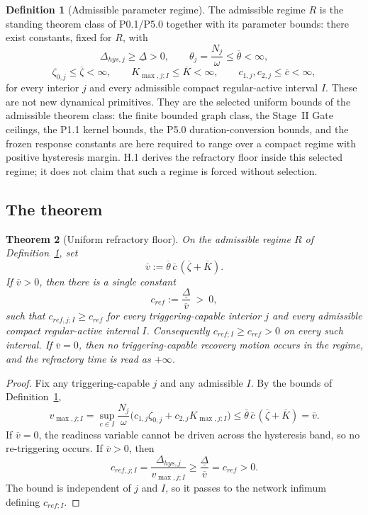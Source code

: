 \documentclass[11pt,a4paper]{article}
\newcommand{\cint}{\ensuremath{\mathfrak c}}
\def\mathfrak#1{#1}%
\def\mathrm#1{#1}%
\theoremstyle{definition}
\newtheorem{definition}{Definition}[section]
\theoremstyle{plain}
\newtheorem{theorem}[definition]{Theorem}
\theoremstyle{remark}
\begin{document}
\begin{definition}[Admissible parameter regime]\label{def:regime}
The admissible regime \(\mathfrak R\) is the standing theorem class of P0.1/P5.0 together
with its parameter bounds: there exist constants, fixed for \(\mathfrak R\), with
\[
\Delta_{\mathrm{hys},j}\ge\underline{\Delta}>0,
\qquad
\theta_j=\frac{N_j}{\omega}\le\overline{\theta}<\infty,
\]
\[
\zeta_{0,j}\le\overline\zeta<\infty,
\qquad
K_{\max,j;I}\le\overline K<\infty,
\qquad
c_{1,j},c_{2,j}\le\overline c<\infty,
\]
for every interior \(j\) and every admissible compact regular-active interval \(I\). These
are not new dynamical primitives. They are the selected uniform bounds of the admissible
theorem class: the finite bounded graph class, the Stage~II Gate ceilings, the P1.1 kernel
bounds, the P5.0 duration-conversion bounds, and the frozen response constants are here
required to range over a compact regime with positive hysteresis margin. H.1 derives the
refractory floor inside this selected regime; it does not claim that such a regime is forced
without selection.
\end{definition}

\subsection{The theorem}

\begin{theorem}[Uniform refractory floor]\label{thm:unifloor}
On the admissible regime \(\mathfrak R\) of Definition~\ref{def:regime}, set
\[
\overline v
:=
\overline\theta\,\overline c\,(\overline\zeta+\overline K).
\]
If \(\overline v>0\), then there is a single constant
\[
\boxed{\;
\mathfrak c_{\mathrm{ref}}
:=
\frac{\underline\Delta}{\overline v}
\ >\ 0,
\;}
\]
such that \(\mathfrak c_{\mathrm{ref},j;I}\ge\mathfrak c_{\mathrm{ref}}\) for every
triggering-capable interior \(j\) and every admissible compact regular-active interval \(I\).
Consequently \(\mathfrak c_{\mathrm{ref};I}\ge\mathfrak c_{\mathrm{ref}}>0\) on every such
interval. If \(\overline v=0\), then no triggering-capable recovery motion occurs in the
regime, and the refractory time is read as \(+\infty\).
\end{theorem}

\begin{proof}
Fix any triggering-capable \(j\) and any admissible \(I\). By the bounds of
Definition~\ref{def:regime},
\[
v_{\max,j;I}
=
\sup_{\cint\in I}\frac{N_j}{\omega}\bigl(c_{1,j}\zeta_{0,j}+c_{2,j}K_{\max,j;I}\bigr)
\le
\overline\theta\,\overline c\,(\overline\zeta+\overline K)
=
\overline v.
\]
If \(\overline v=0\), the readiness variable cannot be driven across the hysteresis band, so
no re-triggering occurs. If \(\overline v>0\), then
\[
\mathfrak c_{\mathrm{ref},j;I}
=
\frac{\Delta_{\mathrm{hys},j}}{v_{\max,j;I}}
\ge
\frac{\underline\Delta}{\overline v}
=
\mathfrak c_{\mathrm{ref}}>0.
\]
The bound is independent of \(j\) and \(I\), so it passes to the network infimum defining
\(\mathfrak c_{\mathrm{ref};I}\). \qedhere
\end{proof}
\end{document}
